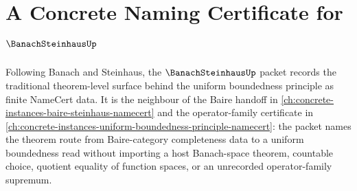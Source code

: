 \chapter{A Concrete Naming Certificate for $\BanachSteinhausUp$}
\label{ch:concrete-instances-banach-steinhaus-namecert}

Following Banach and Steinhaus, the $\BanachSteinhausUp$ packet records the traditional theorem-level surface behind the uniform boundedness principle as finite NameCert data. It is the neighbour of the Baire handoff in \autoref{ch:concrete-instances-baire-steinhaus-namecert} and the operator-family certificate in \autoref{ch:concrete-instances-uniform-boundedness-principle-namecert}: the packet names the theorem route from Baire-category completeness data to a uniform boundedness read without importing a host Banach-space theorem, countable choice, quotient equality of function spaces, or an unrecorded operator-family supremum.

